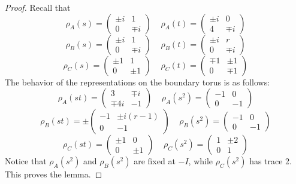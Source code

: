 \documentclass[10pt,a4paper]{amsart}
\begin{document}
\begin{proof}
Recall that 
\begin{equation}
	\rho_A(s) = \begin{pmatrix}\pm i&1\\0&\mp i\end{pmatrix} \ \ \ \ \ \rho_A(t) = \begin{pmatrix}\pm i&0\\4&\mp i\end{pmatrix}
\end{equation}
\begin{equation}
	\rho_B(s) = \begin{pmatrix}\pm i&1\\0&\mp i\end{pmatrix} \ \ \ \ \ \rho_B(t) = \begin{pmatrix}\pm i&r\\0&\mp i\end{pmatrix}
\end{equation}
\begin{equation}
	\rho_C(s) = \begin{pmatrix}\pm1&1\\0&\pm1\end{pmatrix} \ \ \ \ \ \rho_C(t) = \begin{pmatrix}\mp1&\pm1\\0&\mp 1\end{pmatrix}
\end{equation}
The behavior of the representations on the boundary torus is as follows:
\begin{equation}
	\rho_A(st) = \begin{pmatrix}3&\mp i\\\mp 4i&-1\end{pmatrix} \ \ \ \ \ \rho_A(s^2) = \begin{pmatrix}-1&0\\0&-1\end{pmatrix}
\end{equation}
\begin{equation}
	\rho_B(st) = \pm\begin{pmatrix}-1&\pm i(r-1)\\0&-1\end{pmatrix} \ \ \ \ \ \rho_B(s^2) = \begin{pmatrix}-1&0\\0&-1\end{pmatrix}
\end{equation}
\begin{equation}
	\rho_C(st) = \begin{pmatrix}\pm1&0\\0&\pm1\end{pmatrix} \ \ \ \ \ \rho_C(s^2) = \begin{pmatrix}1&\pm 2\\0&1\end{pmatrix}
\end{equation}
Notice that $\rho_A(s^2)$ and $\rho_B(s^2)$ are fixed at $-I$, while $\rho_C(s^2)$ has trace 2. This proves the lemma. 
\end{proof}
\end{document}
